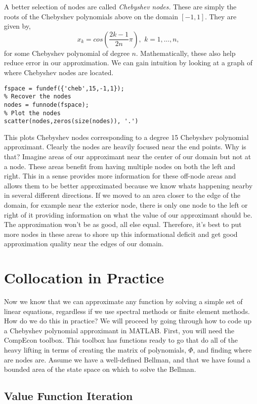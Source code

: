 \documentclass[11pt]{article}%
\begin{document}
A better selection of nodes are called \emph{Chebyshev nodes.} These are simply the roots of the Chebyshev polynomials above on the domain $[-1,1]$. They are given by,$$
x_k = cos\left(\frac{2k-1}{2n}\pi\right),\,\, k = 1,...,n,$$
for some Chebyshev polynomial of degree $n$. Mathematically, these also help reduce error in our approximation. We can gain intuition by looking at a graph of where Chebyshev nodes are located.
\begin{lstlisting}[frame=single]
% Create a structure defining the approximation function we will be using
fspace = fundef({'cheb',15,-1,1});
% Recover the nodes
nodes = funnode(fspace);
% Plot the nodes
scatter(nodes,zeros(size(nodes)), '.')
\end{lstlisting}
This plots Chebyshev nodes corresponding to a degree 15 Chebyshev polynomial approximant. Clearly the nodes are heavily focused near the end points. Why is that? Imagine areas of our approximant near the center of our domain but not at a node. These areas benefit from having multiple nodes on both the left and right. This in a sense provides more information for these off-node areas and allows them to be better approximated because we know whats happening nearby in several different directions. If we moved to an area closer to the edge of the domain, for example near the exterior node, there is only one node to the left or right of it providing information on what the value of our approximant should be. The approximation won't be as good, all else equal. Therefore, it's best to put more nodes in these areas to shore up this informational deficit and get good approximation quality near the edges of our domain.


\section{Collocation in Practice}
Now we know that we can approximate any function by solving a simple set of linear equations, regardless if we use spectral methods or finite element methods. How do we do this in practice? We will proceed by going through how to code up a Chebyshev polynomial approximant in MATLAB. First, you will need the CompEcon toolbox. This toolbox has functions ready to go that do all of the heavy lifting in terms of creating the matrix of polynomials, $\Phi$, and finding where are nodes are. Assume we have a well-defined Bellman, and that we have found a bounded area of the state space on which to solve the Bellman. 

\subsection{Value Function Iteration}
\end{document}
